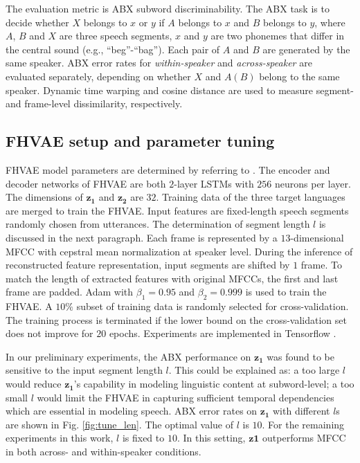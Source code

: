 \documentclass[a4paper]{article}
\newcommand{\quotes}[1]{``#1''}
\begin{document}
The evaluation metric is ABX subword discriminability. The ABX task is to decide whether $X$ belongs to $x$ or $y$ if $A$ belongs to $x$ and $B$ belongs to $y$, where $A$, $B$ and $X$ are three speech segments, $x$ and $y$ are two phonemes that differ in the central sound (e.g., \quotes{beg}-\quotes{bag}). 
Each pair of $A$ and $B$ are generated by the same speaker. 
ABX error rates for \textit{within-speaker} and \textit{across-speaker} are evaluated separately, depending on whether $X$ and $A(B)$ belong to the same speaker.
Dynamic time warping  and cosine distance are used to measure segment- and frame-level dissimilarity, respectively.
\subsection{FHVAE setup and parameter tuning}
FHVAE model parameters are determined by referring to  \cite{hsu2018extracting}. The  encoder and decoder networks of FHVAE are both $2$-layer LSTMs with $256$ neurons per layer. The dimensions of  $\bm{z_1}$ and $\bm{z_2}$ are $32$. 
Training data of the three target languages are merged to train the FHVAE. 
Input features  are fixed-length speech segments randomly chosen from utterances. The determination of segment length $l$ is discussed in the next paragraph. Each frame is represented by a $13$-dimensional MFCC with cepstral mean normalization at speaker level. 
During the inference of reconstructed feature representation, input segments are shifted by $1$ frame. To match the length of extracted features with original MFCCs, the first and last frame are padded. 
Adam \cite{kingma2014adam} with $\beta_1=0.95$ and $\beta_2=0.999$  is used to train the FHVAE. A $10\%$ subset of training data is randomly selected for cross-validation.
The training process is terminated if the lower bound on the cross-validation set does not improve for $20$ epochs. Experiments are implemented in Tensorflow \cite{Abadi2016tensorflow}.

In our preliminary experiments, the ABX performance on $\bm{z_1}$ was found to be sensitive to the input segment length $l$. 
This could be explained as:  a too large  $l$ would reduce  $\bm{z_1}$'s capability in modeling linguistic content at  subword-level; 
a too small $l$ would limit the FHVAE in capturing sufficient temporal dependencies which are essential in modeling speech.  ABX error rates on $\bm{z_1}$ with different $l$s   are shown in Fig. \ref{fig:tune_len}. 
The optimal value of $l$ is $10$. For the remaining experiments in this work, $l$ is fixed to $10$. In this setting, $\bm{z1}$ outperforms MFCC in both across- and within-speaker conditions.
\end{document}
